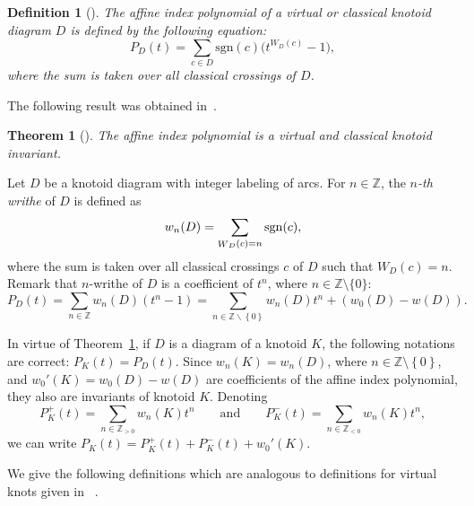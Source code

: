 \documentclass[11pt]{amsart}
\theoremstyle{noparens}
\newtheorem{theorem}{Theorem}[section]
\newtheorem{definition}{Definition}[section]
\numberwithin{equation}{section}
\numberwithin{equation}{section}
\begin{document}
\begin{definition} [\cite{GK}] {\rm 
The \textit{affine index polynomial} of a virtual or classical knotoid diagram $D$ is defined by the following equation:  
\begin{equation} 
P_D (t) = \sum_{c \in D} \mathrm{sgn} (c) \Big(t^{W_D (c)} - 1\Big),
\end{equation} 
where the sum is taken over all classical crossings of $D$. 
}
\end{definition}

The following result was obtained in~\cite[Th.~5.1]{GK}. 

\begin{theorem} [\cite{GK}]   \label{th1}
The affine index polynomial is a virtual and classical knotoid invariant. 
\end{theorem}
 
Let $D$ be a knotoid diagram with integer labeling of arcs. For $n \in \mathbb Z$, the \textit{$n$-th writhe} of $D$ is defined as 
\begin{equation}
w_n(D) = \sum_{\substack W_{D}(c)=n} \mathrm{sgn}(c),  
\end{equation}
where the sum is taken over all classical crossings $c$ of $D$ such that $W_D(c) = n$.
Remark  that $n$-writhe of $D$ is a coefficient of $t^n$, where $n \in \mathbb Z \setminus \{0\}$: 
\begin{equation} 
P_{D}(t) = \sum_{n \in \mathbb{Z} } w_{n} (D) \left(t^n - 1 \right) = \sum_{n \in \mathbb{Z} \backslash \left\{ 0 \right\} } w_{n}(D) t^n + \left( w_{0}(D) - w(D) \right). \label{eqn:PD}
\end{equation}

In virtue of  Theorem~\ref{th1}, if $D$ is a diagram of a knotoid $K$,  the following notations are correct: $P_{K}(t)=P_ {D}(t)$. Since $w_n (K)=w_n(D)$, where $n \in \mathbb{Z} \setminus \left\{ 0 \right\}$, and  $w_{0}'(K)= w_{0}(D) - w(D)$ are coefficients of the affine index polynomial, they also are invariants of knotoid $K$.  Denoting 
$$ 
P_ {K}^{+}(t) = \sum_{n \in \mathbb{Z}_{>0} } w_{n}(K) t^n \qquad \mbox{and} \qquad P_{K}^{-} (t) = \sum_ {n \in \mathbb{Z}_{<0}} w_n (K) t^n, 
$$
we can write  $P_{K}(t)=P_{K}^{+}(t) + P_{K}^{-}(t) + w_{0}'(K).$ 

 We give the following definitions which are analogous to definitions for virtual knots given in ~\cite{Kim}.  
\end{document}
